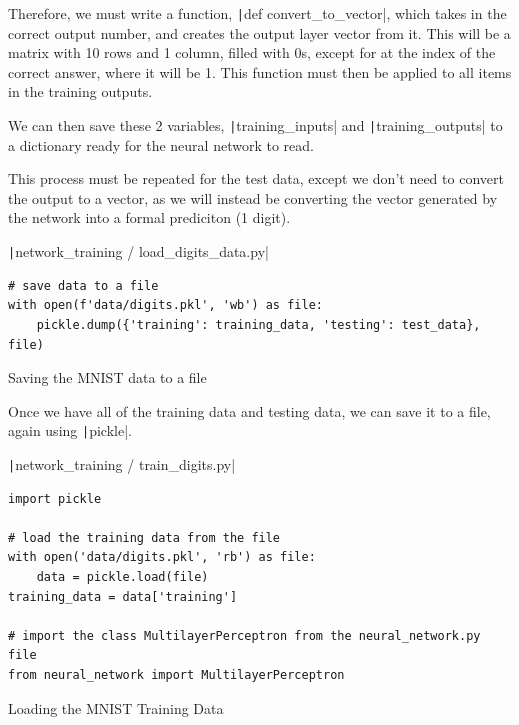 \documentclass[12pt]{report}
\newcommand{\pil}[1]{\protect\texttt|#1|}
\begin{document}
Therefore, we must write a function, \pil{def convert_to_vector}, which takes in the correct output number, and creates the output layer vector from it. This will be a matrix with 10 rows and 1 column, filled with 0s, except for at the index of the correct answer, where it will be 1. This function must then be applied to all items in the training outputs.

We can then save these 2 variables, \pil{training_inputs} and \pil{training_outputs} to a dictionary ready for the neural network to read.

This process must be repeated for the test data, except we don't need to convert the output to a vector, as we will instead be converting the vector generated by the network into a formal prediciton (1 digit).

\begin{listing}[H]
\pil{network_training / load_digits_data.py}
\begin{verbatim}
# save data to a file
with open(f'data/digits.pkl', 'wb') as file:
    pickle.dump({'training': training_data, 'testing': test_data}, file)
\end{verbatim}
\caption{Saving the MNIST data to a file}\label{cs:MNISTtoFile}
\end{listing}

Once we have all of the training data and testing data, we can save it to a file, again using \pil{pickle}.

\begin{center}
\end{center}

\begin{listing}[H]
\pil{network_training / train_digits.py}
\begin{verbatim}
import pickle

# load the training data from the file
with open('data/digits.pkl', 'rb') as file:
    data = pickle.load(file)
training_data = data['training']

# import the class MultilayerPerceptron from the neural_network.py file
from neural_network import MultilayerPerceptron
\end{verbatim}
\caption{Loading the MNIST Training Data}\label{cs:loadTrainingMNIST}
\end{listing}
\end{document}
